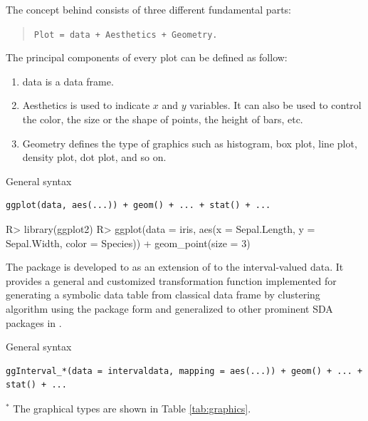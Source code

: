 \documentclass[article]{jss}
\begin{document}
The concept behind  consists of three different fundamental parts: 
\begin{quote}
{\tt Plot = data + Aesthetics + Geometry.}
\end{quote}
The principal components of every plot can be defined as follow:
\begin{enumerate}
\item data is a data frame.
\item Aesthetics is used to indicate $x$ and $y$ variables. It can also be used to control the color, the size or the shape of points, the height of bars, etc.
\item Geometry defines the type of graphics such as histogram, box plot, line plot, density plot, dot plot, and so on.
\end{enumerate}

General  syntax
\begin{verbatim}
ggplot(data, aes(...)) + geom() + ... + stat() + ...
\end{verbatim}

\begin{CodeChunk}
\begin{CodeInput}
R> library(ggplot2)
R> ggplot(data = iris, aes(x = Sepal.Length, y = Sepal.Width, color = Species)) +
         geom_point(size = 3)
\end{CodeInput}
\end{CodeChunk}

The package  is developed to as an extension of  to the interval-valued data. 
It provides a general and customized
transformation function  implemented for generating
a symbolic data table from classical data frame by clustering
algorithm using the  package \cite{RSDA} form and
generalized  to other prominent SDA packages in
.

General  syntax

\begin{verbatim}
ggInterval_*(data = intervaldata, mapping = aes(...)) + geom() + ... + stat() + ...
\end{verbatim}

\begin{footnotesize}
$^*$ The graphical types are shown in Table \ref{tab:graphics}.
\end{footnotesize}


\end{document}
